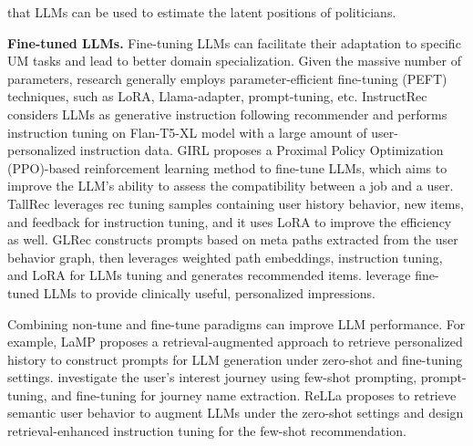 \documentclass[11pt]{article}
\renewcommand\paragraph[1]{\vspace{0.05in} \noindent \textbf{#1.}}
\begin{document}
that LLMs can be used to estimate the latent positions of politicians.

\paragraph{Fine-tuned LLMs}
Fine-tuning LLMs can facilitate their adaptation to specific UM tasks and lead to better domain specialization. Given the massive number of parameters, research generally employs parameter-efficient fine-tuning (PEFT) techniques, such as LoRA, Llama-adapter, prompt-tuning, etc. InstructRec \cite{zhang2023recommendation} considers LLMs as generative instruction following recommender and performs instruction tuning on Flan-T5-XL \cite{chung2022scaling} model with a large amount of user-personalized instruction data. GIRL \cite{zheng2023generative} proposes a Proximal Policy Optimization (PPO)-based reinforcement learning method to fine-tune LLMs, which aims to improve the LLM's ability to assess the compatibility between a job and a user. TallRec \cite{bao2023tallrec} leverages rec tuning samples containing user history behavior, new items, and feedback for instruction tuning, and it uses LoRA to improve the efficiency as well. GLRec \cite{wu2023exploring} constructs prompts based on meta paths extracted from the user behavior graph, then leverages weighted path embeddings, instruction tuning, and LoRA for LLMs tuning and generates recommended items. \citet{tie2023automatic} leverage fine-tuned LLMs to provide clinically useful, personalized impressions.

Combining non-tune and fine-tune paradigms can improve LLM performance. For example, LaMP \cite{salemi2023lamp} proposes a retrieval-augmented approach to retrieve personalized history to construct prompts for LLM generation under zero-shot and fine-tuning settings. \citet{christakopoulou2023large} investigate the user's interest journey using few-shot prompting, prompt-tuning, and fine-tuning for journey name extraction. ReLLa \cite{lin2023rella} proposes to retrieve semantic user behavior to augment LLMs under the zero-shot settings and design retrieval-enhanced instruction tuning for the few-shot recommendation.
\end{document}
